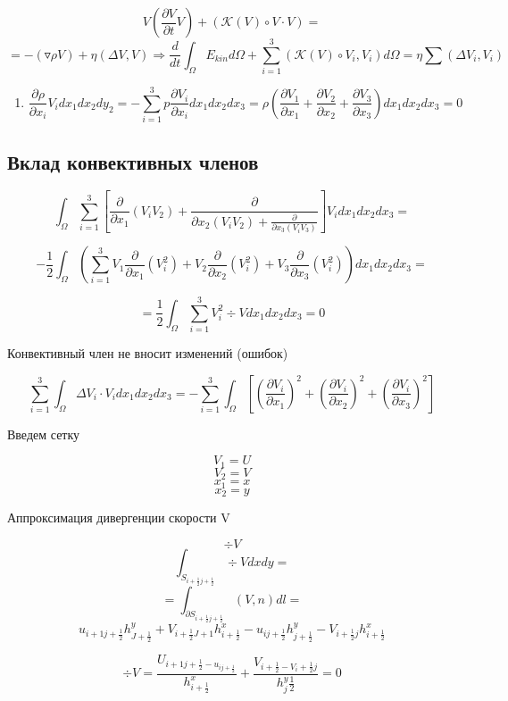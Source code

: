 \documentclass[12pt, a4paper]{article}
\begin{document}
\[ V (\frac{\partial V}{\partial  t} V) + (\mathcal{K}(V) \circ V \cdot V) = \]
\[ = -(\triangledown \rho V) + \eta (\Delta V, V) \Rightarrow \frac{d}{d t} \int_{\Omega}^{} E_{kin} d\Omega + \sum_{i=1}^{3} (\mathcal{K}(V)\circ V_i, V_i) d\Omega = \eta \sum_{}^{}(\Delta V_i, V_i) \]

\begin{enumerate}
	\item \[ \frac{\partial \rho}{\partial  x_i} V_i dx_1 dx_2 dy_2  = -\sum_{i=1}^{3}p \frac{\partial V_i}{\partial  x_i} dx_1 dx_2 dx_3 = \rho (\frac{\partial V_1}{\partial  x_1}+\frac{\partial V_2}{\partial x_2}+\frac{\partial V_3}{\partial x_3}) dx_1 dx_2 dx_3 = 0\]
\end{enumerate}

\subsection{Вклад конвективных членов}

\[ \int_{\Omega}^{}\sum_{i=1}^{3}[ \frac{\partial }{\partial x_1} (V_i V_2) + \frac{\partial }{\partial x_2(V_i V_2) + \frac{\partial }{\partial x_3(V_i V_3)}}] V_i dx_1 dx_2 dx_3 = \]

\[ -\frac{1}{2} \int_{\Omega}^{}( \sum_{i=1}^{3} V_1 \frac{\partial }{\partial x_1}(V_i^2)+V_2 \frac{\partial }{\partial x_2}(V_i^2)+V_3 \frac{\partial }{\partial x_3}(V_i^2)) dx_1 dx_2 dx_3 =  \]

\[ = \frac{1}{2} \int_{\Omega}^{} \sum_{i=1}^{3} V_i^2 \div V dx_1 dx_2 dx_3 = 0 \]

Конвективный член не вносит изменений (ошибок)

\[ \sum_{i=1}^{3} \int_{\Omega}^{} \Delta V_i \cdot V_i dx_1 dx_2 dx_3 = - \sum_{i=1}^{3} \int_{\Omega}^{} [ (\frac{\partial V_i}{\partial x_1})^2+ (\frac{\partial V_i}{\partial x_2})^2 + (\frac{\partial V_i}{\partial x_3})^2] \]

Введем сетку

\[ V_1 = U \]
\[ V_2 = V \]
\[ x_1 = x \]
\[ x_2 = y \]

Аппроксимация дивергенции скорости V

\[ \div V \]
\[ \int_{S_{i+\frac{1}{2} j+\frac{1}{2}}}^{} \div V dx dy = \]
\[ = \int_{\partial  S_{i+\frac{1}{2} j+\frac{1}{2}}}^{} (V, n)dl = \]
\[ u_{i+1 j + \frac{1}{2}} h^y_{J+\frac{1}{2}} + V_{i+\frac{1}{2} J+1} h^x_{i+\frac{1}{2}} - u_{ij+\frac{1}{2}} h^y_{j+\frac{1}{2}} - V_{i+\frac{1}{2}j} h^x_{i+\frac{1}{2}} \]

\[ \div V = \frac{U_{i+1j+\frac{1}{2} - u_{ij+\frac{1}{2}}}}{h^x_{i+\frac{1}{2}}} + \frac{V_{i+\frac{1}{2}-V_i+\frac{1}{2}j}}{h^y_j\frac{1}{2}} = 0 \]
\end{document}

